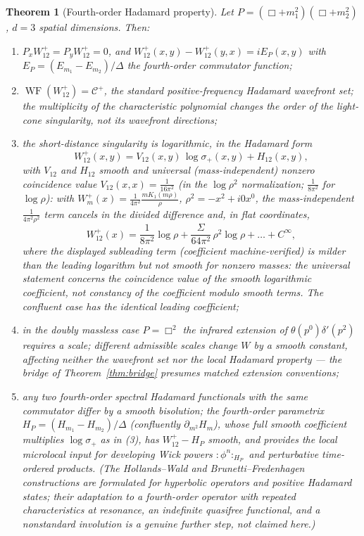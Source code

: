 \documentclass[11pt]{article}
\newtheorem{theorem}{Theorem}[section]
\theoremstyle{definition}
\theoremstyle{remark}
\newcommand{\WF}{\operatorname{WF}}
\begin{document}
\begin{theorem}[Fourth-order Hadamard property]\label{thm:hadamard}
Let $P=(\Box+m_1^2)(\Box+m_2^2)$, $d=3$ spatial dimensions.  Then:
\begin{enumerate}
\item $P_xW^+_{12}=P_yW^+_{12}=0$, and
$W^+_{12}(x,y)-W^+_{12}(y,x)=iE_P(x,y)$ with
$E_P=(E_{m_1}-E_{m_2})/\Delta$ the fourth-order commutator function;
\item $\WF(W^+_{12})=\mathcal C^+$, the standard positive-frequency
Hadamard wavefront set; the multiplicity of the characteristic polynomial
changes the order of the light-cone singularity, not its wavefront
directions;
\item the short-distance singularity is logarithmic, in the Hadamard
form
\begin{equation}
W^+_{12}(x,y)=V_{12}(x,y)\,\log\sigma_+(x,y)+H_{12}(x,y),
\end{equation}
with $V_{12}$ and $H_{12}$ smooth and universal (mass-independent)
nonzero coincidence value $V_{12}(x,x)=\frac{1}{16\pi^2}$ (in the
$\log\rho^2$ normalization; $\frac1{8\pi^2}$ for $\log\rho$): with
$W_m^+(x)=\frac{1}{4\pi^2}\frac{mK_1(m\rho)}{\rho}$,
$\rho^2=-x^2+i0x^0$, the mass-independent $\frac{1}{4\pi^2\rho^2}$ term
cancels in the divided difference and, in flat coordinates,
\begin{equation}
W^+_{12}(x)=\frac{1}{8\pi^2}\log\rho
+\frac{\Sigma}{64\pi^2}\,\rho^2\log\rho+\dots+C^\infty ,
\end{equation}
where the displayed subleading term (coefficient machine-verified) is
milder than the leading logarithm but \emph{not} smooth for nonzero
masses: the universal statement concerns the coincidence value of the
smooth logarithmic coefficient, not constancy of the coefficient modulo
smooth terms.  The confluent case has the identical leading coefficient;
\item in the doubly massless case $P=\Box^2$ the infrared extension of
$\theta(p^0)\delta'(p^2)$ requires a scale; different admissible scales
change $W$ by a smooth constant, affecting neither the wavefront set nor
the local Hadamard property --- the bridge of Theorem~\ref{thm:bridge}
presumes matched extension conventions;
\item any two fourth-order spectral Hadamard functionals with the same
commutator differ by a smooth bisolution; the fourth-order parametrix
$H_P=(H_{m_1}-H_{m_2})/\Delta$ (confluently $\partial_{m^2}H_m$), whose
full smooth coefficient multiplies $\log\sigma_+$ as in (3), has
$W^+_{12}-H_P$ smooth, and provides the local microlocal input for
developing Wick powers $:\!\phi^n\!:_{H_P}$ and perturbative
time-ordered products.  (The Hollands--Wald and Brunetti--Fredenhagen
constructions are formulated for hyperbolic operators and positive
Hadamard states; their adaptation to a fourth-order operator with
repeated characteristics at resonance, an indefinite quasifree
functional, and a nonstandard involution is a genuine further step, not
claimed here.)
\end{enumerate}
\end{theorem}
\end{document}
